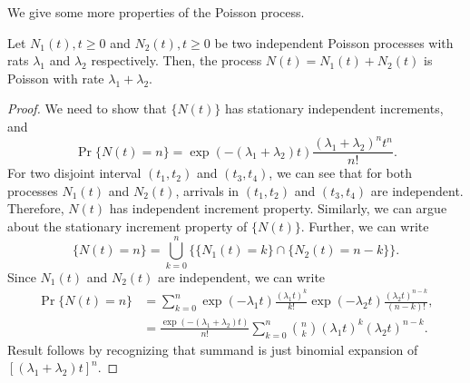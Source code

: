 \documentclass[a4paper,10pt,english]{article}
\begin{document}
We give some more properties of the Poisson process.
\begin{thm} Let ${N_1(t), t \geqslant  0}$ and ${N_2(t), t \geqslant  0}$ be two independent Poisson processes with rats $\lambda_{1}$ and $\lambda_{2}$ respectively. Then, the process $N(t)= N_{1}(t) +N_{2}(t)$ is Poisson with rate $\lambda_{1}+\lambda_{2}$.
\end{thm}
\begin{proof} We need to show that $\{N(t)\}$ has stationary independent increments, and 
\begin{equation*}
	\Pr\{N(t)=n\}=   \exp(-(\lambda_{1}+\lambda_{2})t)\frac{(\lambda_{1}+\lambda_{2})^n t^n}{n!}.
\end{equation*}
For two disjoint interval $(t_{1}, t_{2})$ and $(t_3,t_4)$, we can see that for both processes $N_{1}(t)$ and $N_2(t)$,  arrivals in $(t_{1}, t_{2})$ and $(t_3,t_{4})$ are independent. Therefore, $N(t)$ has independent increment property. Similarly, we can argue about the stationary increment property of $\{N(t)\}$. Further, we can write 
\begin{equation*}
	\{N(t)=n\} = \bigcup_{k=0}^n\{\{N_1(t) = k\}\cap\{N_2(t) = n-k\}\}.
\end{equation*}
Since $N_1(t)$ and $N_2(t)$ are independent, we can write
\begin{align*}
	\Pr\{N(t)=n\} &= \sum_{k=0}^n\exp(-\lambda_1t)\frac{(\lambda_1t)^k}{k!}\exp(-\lambda_2t)\frac{(\lambda_2t)^{n-k}}{(n-k)!},\\
	&= \frac{\exp(-(\lambda_1+\lambda_2)t)}{n!}\sum_{k=0}^n\binom{n}{k}(\lambda_1t)^k(\lambda_2t)^{n-k}.%
\end{align*}
Result follows by recognizing that summand is just binomial expansion of $[(\lambda_1 + \lambda_2)t]^n$.
\end{proof}
\end{document}

